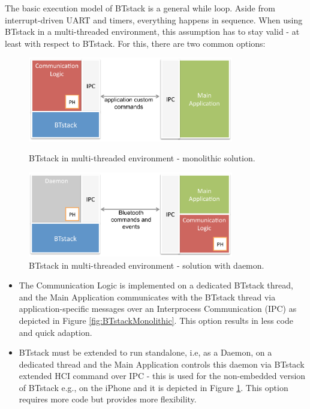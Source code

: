 \documentclass[a4paper,titlepage,oneside,12pt]{amsart} %
\begin{document}
The basic execution model of BTstack is a general while loop. Aside from interrupt-driven UART and timers, everything happens in sequence. 
When using BTstack in a multi-threaded environment,  this assumption has to stay valid - at least with respect to BTstack. For this, there are two common options:

\begin{figure}[ht]
\begin{minipage}[b]{\linewidth}
\centering
   \includegraphics[width=0.8\textwidth]{picts/multithreading-monolithic.pdf} 
   \caption{BTstack in multi-threaded environment - monolithic solution.}
   \label{fig:BTstackMonolithic}
\vspace{0.8cm}
\end{minipage}

\begin{minipage}[b]{\linewidth}
\centering
   \includegraphics[width=0.8\textwidth]{picts/multithreading-btdaemon.pdf} 
   \caption{BTstack in multi-threaded environment - solution with daemon.}
   \label{fig:BTstackDaemon}
\end{minipage}
\end{figure}

\begin{itemize}
\item The Communication Logic is implemented on a dedicated BTstack thread, and the Main Application communicates with the BTstack thread via application-specific messages over an Interprocess Communication (IPC) as depicted in Figure \ref{fig:BTstackMonolithic}. This option results in less code and quick adaption.
\item BTstack must be extended to run standalone, i.e, as a Daemon, on a dedicated thread and the Main Application controls this daemon via BTstack extended HCI command over IPC - this is used for the non-embedded version of BTstack e.g., on the iPhone and it is depicted in Figure \ref{fig:BTstackDaemon}. This option requires more code but provides more flexibility.
\end{itemize}
\end{document}
